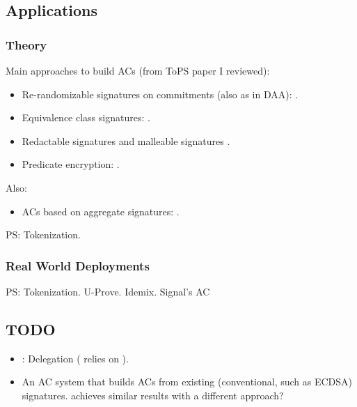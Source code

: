\subsection{Applications}
\label{ssec:acapplication}

\subsubsection{Theory}
\label{sssec:actheoryapp}

Main approaches to build ACs (from ToPS paper I reviewed):

\begin{itemize}
\item Re-randomizable signatures on commitments (also as in DAA):
  \cite{cl02,cl04,lmpy16,ps16}.
\item Equivalence class signatures: \cite{fhs19,hs14}.
\item Redactable signatures \cite{cdhk15,sand20} and malleable signatures
  \cite{ckl14}.
\item Predicate encryption: \cite{dmm+18}.
\end{itemize}

Also:

\begin{itemize}
  \item ACs based on aggregate signatures: \cite{cl11}.
\end{itemize}

PS: Tokenization.

\subsubsection{Real World Deployments}
\label{sssec:acrwdeploy}

PS: Tokenization.
U-Prove.
Idemix.
Signal's AC \needcite

\subsection{TODO}

\begin{itemize}
\item : Delegation (\cite{cklm14} relies on \cite{cklm12}).
\item \cite{cgm16} An AC system that builds ACs from existing (conventional,
  such as ECDSA) signatures. \cite{kkl+16} achieves similar results with a
  different approach?
\end{itemize}

